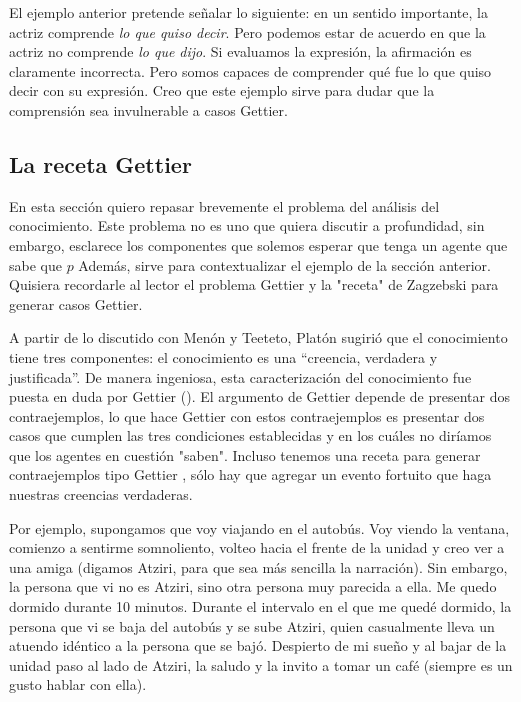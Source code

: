 El ejemplo anterior pretende señalar lo siguiente: en un sentido importante, la actriz comprende \emph{lo que quiso decir}.
Pero podemos estar de acuerdo en que la actriz no comprende \emph{lo que dijo}.
Si evaluamos la expresión, la afirmación es claramente incorrecta.
Pero somos capaces de comprender qué fue lo que quiso decir con su expresión.
Creo que este ejemplo sirve para dudar que la comprensión sea invulnerable a casos Gettier.


\subsection{La receta Gettier}

En esta sección quiero repasar brevemente el problema del análisis del conocimiento.
Este problema no es uno que quiera discutir a profundidad, sin embargo, esclarece los componentes que solemos esperar que tenga un agente que sabe que $p$
Además, sirve para contextualizar el ejemplo de la sección anterior.
Quisiera recordarle al lector el problema Gettier y la "receta" de Zagzebski para generar casos Gettier.

A partir de lo discutido con Menón y Teeteto, Platón sugirió que el conocimiento tiene tres componentes: el conocimiento es una “creencia, verdadera y justificada”.
De manera ingeniosa, esta caracterización del conocimiento fue puesta en duda por Gettier (\citeyear{gettier1963}).
El argumento de Gettier depende de presentar dos contraejemplos, lo que hace Gettier con estos contraejemplos es presentar dos casos que cumplen las tres condiciones establecidas y en los cuáles no diríamos que los agentes en cuestión "saben".
Incluso tenemos una receta para generar contraejemplos tipo Gettier \parencite{zagzebski1994}, sólo hay que agregar un evento fortuito que haga nuestras creencias verdaderas.

Por ejemplo, supongamos que voy viajando en el autobús.
Voy viendo la ventana, comienzo a sentirme somnoliento, volteo hacia el frente de la unidad y creo ver a una amiga (digamos Atziri, para que sea más sencilla la narración).
Sin embargo, la persona que vi no es Atziri, sino otra persona muy parecida a ella.
Me quedo dormido durante 10 minutos.
Durante el intervalo en el que me quedé dormido, la persona que vi se baja del autobús y se sube Atziri, quien casualmente lleva un atuendo idéntico a la persona que se bajó.
Despierto de mi sueño y al bajar de la unidad paso al lado de Atziri, la saludo y la invito a tomar un café (siempre es un gusto hablar con ella).

